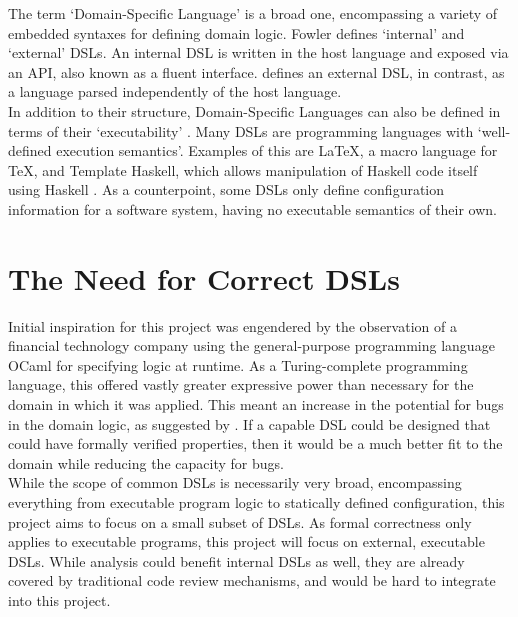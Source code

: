 The term `Domain-Specific Language' is a broad one, encompassing a variety of embedded syntaxes for defining domain logic.
Fowler defines `internal' and `external' DSLs.
An internal DSL is written in the host language and exposed via an API, also known as a fluent interface.
\cite{fowler2010domain} defines an external DSL, in contrast, as a language parsed independently of the host language.\\

In addition to their structure, Domain-Specific Languages can also be defined in terms of their `executability' \citep{Mernik:2005:DDL:1118890.1118892}.
Many DSLs are programming languages with `well-defined execution semantics'.
Examples of this are \LaTeX, a macro language for \TeX, and Template Haskell, which allows manipulation of Haskell code itself using Haskell \citep{Sheard:2002:TMH:581690.581691}.
As a counterpoint, some DSLs only define configuration information for a software system, having no executable semantics of their own.


\section{The Need for Correct DSLs} %
\label{sec:the_need_for_correct_dsls}
Initial inspiration for this project was engendered by the observation of a financial technology company using the general-purpose programming language OCaml for specifying logic at runtime.
As a Turing-complete programming language, this offered vastly greater expressive power than necessary for the domain in which it was applied.
This meant an increase in the potential for bugs in the domain logic, as suggested by \cite{subramanyam2003empirical}.
If a capable DSL could be designed that could have formally verified properties, then it would be a much better fit to the domain while reducing the capacity for bugs.\\

While the scope of common DSLs is necessarily very broad, encompassing everything from executable program logic to statically defined configuration, this project aims to focus on a small subset of DSLs.
As formal correctness only applies to executable programs, this project will focus on external, executable DSLs. 
While analysis could benefit internal DSLs as well, they are already covered by traditional code review mechanisms, and would be hard to integrate into this project.\\

